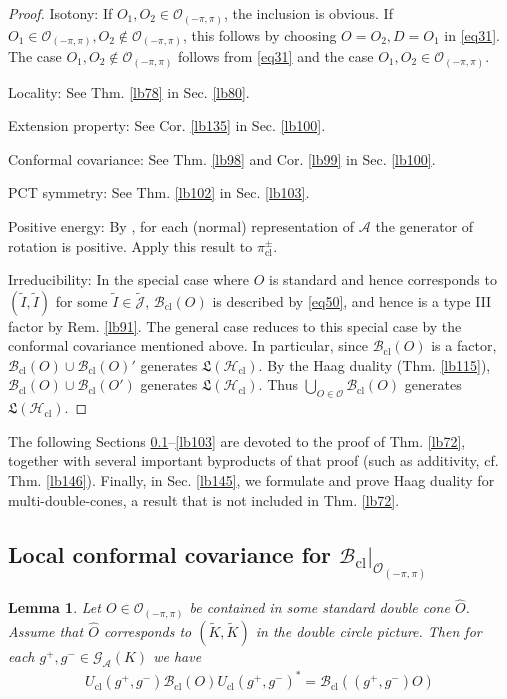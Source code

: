 \documentclass[11pt,b5paper,notitlepage]{article}
\theoremstyle{definition}
\theoremstyle{plain}
\newtheorem{lm}[df]{Lemma}
\newcommand{\fk}{\mathfrak}
\newcommand{\wtd}{\widetilde}
\newcommand{\wht}{\widehat}
\newcommand{\GA}{\mathscr G_{\mathcal A}}
\newcommand{\Jtd}{\widetilde{\mathcal J}}
\newcommand{\cl}{\mathrm{cl}}
\newcommand{\MA}{\mathcal A}
\newcommand{\MH}{\mathcal H}
\newcommand{\MO}{\mathcal O}
\newcommand{\Bcl}{\mathcal B_{\mathrm{cl}}}
\newcommand{\Opp}{\mathcal O_{(-\pi,\pi)}}
\newcommand{\Hcl}{\mathcal H_{\mathrm{cl}}}
\newcommand{\Ucl}{U_{\mathrm{cl}}}
\numberwithin{equation}{section}
\begin{document}
\begin{proof}
Isotony: If $O_1,O_2\in\Opp$, the inclusion is obvious. If $O_1\in\Opp,O_2\notin\Opp$, this follows by choosing $O=O_2,D=O_1$ in \eqref{eq31}. The case $O_1,O_2\notin\Opp$ follows from \eqref{eq31} and the case $O_1,O_2\in\Opp$.

Locality: See Thm. \ref{lb78} in Sec. \ref{lb80}.

Extension property: See Cor. \ref{lb135} in Sec. \ref{lb100}.

Conformal covariance: See Thm. \ref{lb98} and Cor. \ref{lb99} in Sec. \ref{lb100}. 

PCT symmetry: See Thm. \ref{lb102} in Sec. \ref{lb103}.

Positive energy: By \cite{Wei06}, for each (normal) representation of $\MA$ the generator of rotation is positive. Apply this result to $\pi^\pm_\cl$.

Irreducibility: In the special case where $O$ is standard and hence corresponds to $(\wtd I,\wtd I)$ for some $\wtd I\in\Jtd$, $\Bcl(O)$ is described by \eqref{eq50}, and hence is a type III factor by Rem. \ref{lb91}. The general case reduces to this special case by the conformal covariance mentioned above. In particular, since $\Bcl(O)$ is a factor, $\Bcl(O)\cup\Bcl(O)'$ generates $\fk L(\Hcl)$. By the Haag duality (Thm. \ref{lb115}), $\Bcl(O)\cup\Bcl(O')$ generates $\fk L(\MH_\cl)$. Thus $\bigcup_{O\in\MO}\Bcl(O)$ generates $\fk L(\Hcl)$. 
\end{proof}

The following Sections \ref{lb144}--\ref{lb103} are devoted to the proof of Thm. \ref{lb72}, together with several important byproducts of that proof (such as additivity, cf. Thm. \ref{lb146}). Finally, in Sec. \ref{lb145}, we formulate and prove Haag duality for multi-double-cones, a result that is not included in Thm. \ref{lb72}.






\subsection{Local conformal covariance for $\Bcl|_{\Opp}$}\label{lb144}

\begin{lm}\label{lb68}
Let $O\in\Opp$ be contained in some standard double cone $\wht O$. Assume that $\wht O$ corresponds to $(\wtd K,\wtd K)$ in the double circle picture. Then for each $g^+,g^-\in\GA(K)$ we have
\begin{align*}
\Ucl(g^+,g^-)\Bcl(O)\Ucl(g^+,g^-)^*=\Bcl((g^+,g^-)O)
\end{align*}
\end{lm}
\end{document}
